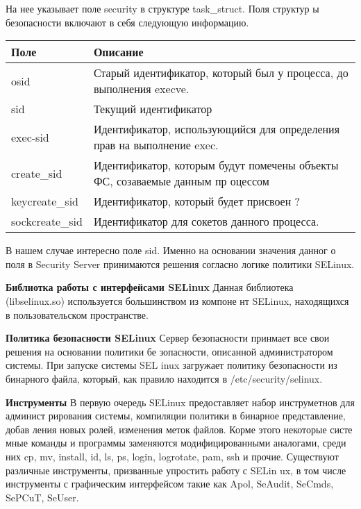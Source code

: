 \bigskip
На нее указывает поле security в структуре task\_struct. Поля структур
ы безопасности включают в себя следующую информацию. 

\begin{tabular}{|p{3cm}|p{9cm}|}
\hline 
\ttfamily Поле 
& 
Описание \\ 
\hline
osid
& 
Старый идентификатор, который был у процесса, до выполнения execve. \\

\hline
sid
& 
Текущий идентификатор \\
\hline
exec-sid
&
Идентификатор, использующийся для определения прав на выполнение exec.
 \\
\hline
create\_sid 
&
Идентификатор, которым будут помечены объекты ФС, созаваемые данным пр
оцессом \\
\hline
keycreate\_sid
& 
Идентификатор, который будет присвоен ? \\ 
\hline
sockcreate\_sid  
&
Идентификатор для сокетов данного процесса. \\ 
\hline
\end {tabular}

\bigskip
В нашем случае интересно поле sid. Именно на основании значения данног
о поля в Security Server принимаются решения согласно логике политики 
SELinux. 

\bigskip
{\bfseries Библиотка работы с интерфейсами SELinux} 
Данная библиотека (libselinux.so) используется большинством из компоне
нт SELinux, находящихся в пользовательском пространстве.

\bigskip
{\bfseries Политика безопасности SELinux} 
Сервер безопасности принмает все свои решения на основании политики бе
зопасности, описанной администратором системы. При запуске системы SEL
inux загружает политику безопасности из бинарного файла, который, как 
правило находится в /etc/security/selinux. 

\bigskip
{\bfseries Инструменты} 
В первую очередь SELinux предоставляет набор инструметнов для админист
рирования системы, компиляции политики в бинарное представление, добав
ления новых ролей, изменения меток файлов. Корме этого некоторые систе
мные команды и программы заменяются модифицированными аналогами, среди
 них cp, mv, install, id, ls, ps, login, logrotate, pam, ssh и прочие.
 Существуют различные инструменты, призванные упростить работу с SELin
ux, в том числе инструменты с графическим интерфейсом такие как Apol, 
SeAudit, SeCmds, SePCuT, SeUser. 
